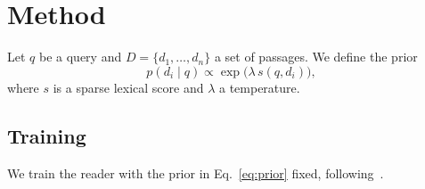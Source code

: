 \section{Method}
\label{sec:method}
Let $q$ be a query and $D = \{d_1, \dots, d_n\}$ a set of passages. We define the prior
\begin{equation}
  \label{eq:prior}
  p(d_i \mid q) \propto \exp\big(\lambda \, s(q, d_i)\big),
\end{equation}
where $s$ is a sparse lexical score and $\lambda$ a temperature.

\subsection{Training}
We train the reader with the prior in Eq.~\eqref{eq:prior} fixed, following~\cite{izacard2021fid}.

